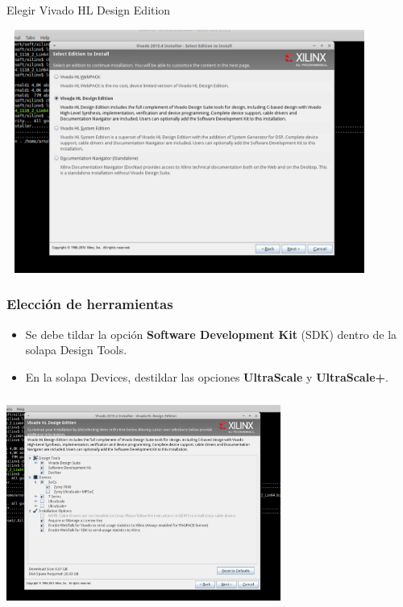 \documentclass[a4paper,11pt]{article}
\begin{document}
Elegir Vivado HL Design Edition
    \begin{center}
    \includegraphics[height=8cm,width=12cm]{vivado_installer_3}
    \end{center}

\subsubsection{Elección de herramientas}
    \begin{itemize}
      \item Se debe tildar la opción \textbf{Software Development Kit} (SDK)
dentro de la solapa Design Tools.
      \item En la solapa Devices, destildar las opciones \textbf{UltraScale} y
            \textbf{UltraScale+}.
    \end{itemize}
    \begin{center}
    \includegraphics[height=7cm,width=9cm]{vivado_installer_4}
    \end{center}
\end{document}
